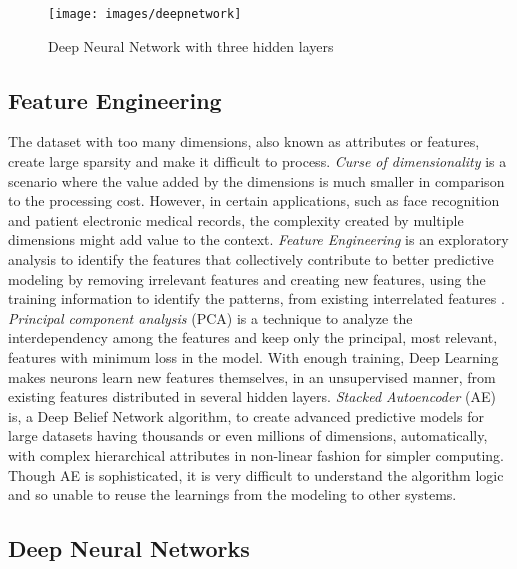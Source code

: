 \documentclass[sigconf]{acmart}
\begin{document}
	\begin{figure}
		\centering
		\texttt{[image: images/deepnetwork]}
		\caption{Deep Neural Network with three hidden layers \cite{Goodfellow2016}} \label{fig:figure2} 
	\end{figure}

	\subsection{Feature Engineering}
	
	The dataset with too many dimensions, also known as attributes or features, create large sparsity and make it difficult to process. {\em Curse of dimensionality} is a scenario where the value added by the dimensions is much smaller in comparison to the processing cost. However, in certain applications, such as face recognition and patient electronic medical records, the complexity created by multiple dimensions might add value to the context. {\em Feature Engineering} is an exploratory analysis to identify the features that collectively contribute to better predictive modeling by removing irrelevant features and creating new features, using the training information to identify the patterns, from existing interrelated features \cite{JasonBrownlee2014}. {\em Principal component analysis} (PCA) is a technique to analyze the interdependency among the features and keep only the principal, most relevant, features with minimum loss in the model. With enough training, Deep Learning makes neurons learn new features themselves, in an unsupervised manner, from existing features distributed in several hidden layers. {\em Stacked Autoencoder} (AE) is, a Deep Belief Network algorithm, to create advanced predictive models for large datasets having thousands or even millions of dimensions, automatically, with complex hierarchical attributes in non-linear fashion for simpler computing. Though AE is sophisticated, it is very difficult to understand the algorithm logic and so unable to reuse the learnings from the modeling to other systems. 
		
	
	\subsection{Deep Neural Networks}
	
\end{document}
